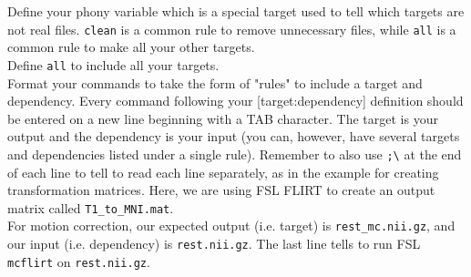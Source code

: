 \indent{}Define your phony variable which is a special target used to tell \maken{} which targets are not real files. \texttt{clean} is a common rule to remove unnecessary files, while \texttt{all} is a common rule to make all your other targets. \\
\indent{}Define \texttt{all} to include all your targets. \\
\indent{}Format your commands to take the form of "rules" to include a target and dependency. Every command following your [target:dependency] definition should be entered on a new line beginning with a TAB character. The target is your output and the dependency is your input (you can, however, have several targets and dependencies listed under a single rule). Remember to also use \texttt{;\textbackslash{}} at the end of each line to tell \maken{} to read each line separately, as in the example for creating transformation matrices. Here, we are using FSL FLIRT to create an output matrix called \texttt{T1_to_MNI.mat}. \\ 
\indent{}For motion correction, our expected output (i.e. target) is \texttt{rest_mc.nii.gz}, and our input (i.e. dependency) is \texttt{rest.nii.gz}. The last line tells \maken{} to run FSL \texttt{mcflirt} on \texttt{rest.nii.gz}. 

